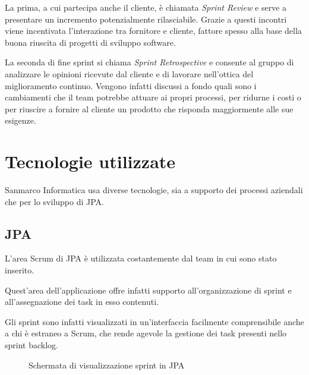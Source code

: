 La prima, a cui partecipa anche il cliente, è chiamata \emph{Sprint Review} e
serve a presentare un incremento potenzialmente rilasciabile. Grazie
a questi incontri viene incentivata l'interazione tra fornitore e cliente,
fattore spesso alla base della buona riuscita di progetti di sviluppo software.

La seconda  di fine sprint si chiama \emph{Sprint
Retrospective} e consente al gruppo di analizzare le opinioni ricevute dal
cliente e di lavorare nell'ottica del miglioramento continuo. Vengono infatti
discussi a fondo quali sono i cambiamenti che il team potrebbe attuare ai
propri processi, per ridurne i costi o per riuscire a fornire al cliente un
prodotto che risponda maggiormente alle sue esigenze.
\section{Tecnologie utilizzate}\label{sec:azienda-tecnologie}

Sanmarco Informatica usa diverse tecnologie, sia a supporto dei processi
aziendali che per lo sviluppo di JPA.

\subsection{JPA}

L'area Scrum di JPA è utilizzata costantemente dal team in cui sono stato
inserito.

Quest'area dell'applicazione offre infatti supporto all'organizzazione di
sprint e all'assegnazione dei task in esso contenuti.

Gli sprint sono infatti visualizzati in un'interfaccia facilmente comprensibile
anche a chi è estraneo a Scrum, che rende agevole la gestione dei task presenti
nello sprint backlog.

\begin{figure}%
  \noindent{}%
  \caption{Schermata di visualizzazione sprint in JPA}%
  \label{fig:jpa-viewer}%
\end{figure}

